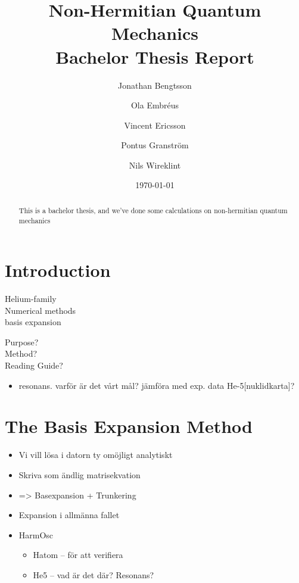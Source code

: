 \documentclass[12pt,a4paper]{report}
\begin{document}
  


\title{Non-Hermitian Quantum Mechanics\\
\Large Bachelor Thesis Report}
\author{Jonathan Bengtsson  \and Ola Embréus \and Vincent Ericsson \and Pontus Granström \and Nils Wireklint}
\date{\today}



\maketitle

\newpage
\begin{abstract}
This is a bachelor thesis, and we've done some calculations on non-hermitian quantum mechanics 
\end{abstract}
\newpage

\tableofcontents

\newpage

\chapter{Introduction}
\label{cha:introduktion}

{\Large Helium-family \\ Numerical methods\\ basis expansion}

{\Large Purpose? \\ Method? \\ Reading Guide?}

\begin{itemize}
  \item resonans. varför är det vårt mål? jämföra med exp. data He-5[nuklidkarta]?
\end{itemize}



\chapter{The Basis Expansion Method} %
\label{cha:the_basis_expansion_method}

\begin{itemize}
  \item Vi vill lösa i datorn ty omöjligt analytiskt
  \item Skriva som ändlig matrisekvation
  \item => Basexpansion + Trunkering
  \item Expansion i allmänna fallet
  \item HarmOsc
  \begin{itemize}
    \item Hatom – för att verifiera
    \item He5 – vad är det där? Resonans?
  \end{itemize}
\end{itemize}
\end{document}
